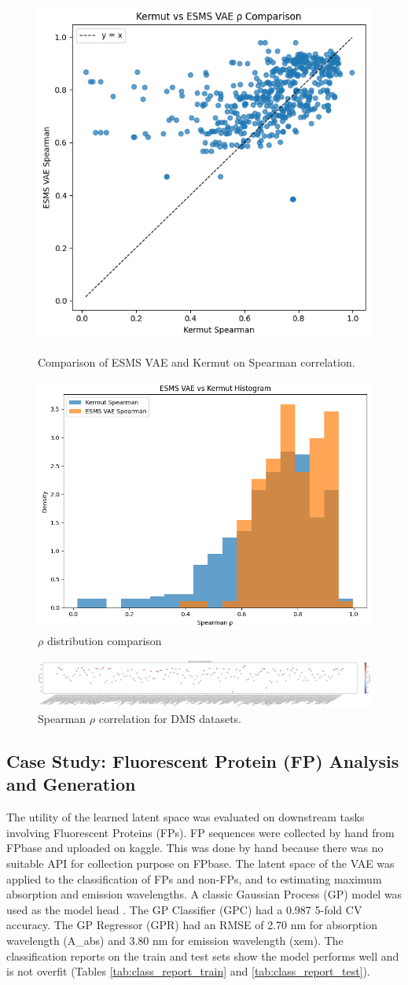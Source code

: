 \documentclass[unnumsec,webpdf,contemporary,medium]{oup-authoring-template}
\begin{document}
\begin{figure}[!ht]
    \centering
    \includegraphics[width=0.4\linewidth]{ESMS_Kermut.png}
    \caption{Comparison of ESMS VAE and Kermut on Spearman correlation.}
    \label{fig:Spearman_comparison}
    \includegraphics[width=0.5\linewidth]{ESMS_kermut_dist.png}
    \caption{\protect$\rho$ distribution comparison}
    \label{fig:$\rho$ distribution comparison}
\end{figure}

\begin{figure}[!ht]
    \centering
    \includegraphics[width=1\linewidth]{DMS.png}
    \caption{Spearman $\rho$ correlation for DMS datasets.}
    \label{fig:dms_result}
\end{figure}
\subsection{Case Study: Fluorescent Protein (FP) Analysis and Generation}\label{sec:fp_application}
The utility of the learned latent space was evaluated on downstream tasks involving Fluorescent Proteins (FPs). FP sequences were collected by hand from FPbase \cite{lambert2022fpbase} and uploaded on kaggle. This was done by hand because there was no suitable API for collection purpose on FPbase. The latent space of the VAE was applied to the classification of FPs and non-FPs, and to estimating maximum absorption and emission wavelengths. A classic Gaussian Process (GP) model was used as the model head \cite{rasmussen2006gaussian}. The GP Classifier (GPC) had a 0.987 5-fold CV accuracy. The GP Regressor (GPR) had an RMSE of 2.70 nm for absorption wavelength (A\_abs) and 3.80 nm for emission wavelength (xem). The classification reports on the train and test sets show the model performs well and is not overfit (Tables \ref{tab:class_report_train} and \ref{tab:class_report_test}).
\end{document}
